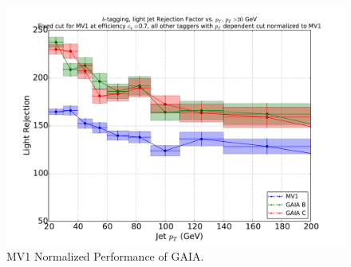 \begin{figure}[h]
\includegraphics[width=\textwidth]{figures/btag/u_rej_mv1normalized_pTdep_70pct.pdf}
\caption[The ATLAS detector]{MV1 Normalized Performance of GAIA.
\label{fig:urejmv1norm70}}
\end{figure}



















%







